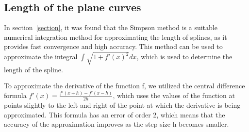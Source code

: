 \subsection{Length of the plane curves} 
In section~\ref{section}, it was found that the Simpson method is a suitable numerical integration method for approximating the length of splines, as it provides fast convergence and high accuracy. This method can be used to approximate the integral $\int \sqrt{1+f'(x)^{2}}dx$, which is used to determine the length of the spline.

To approximate the derivative of the function f, we utilized the central difference formula $f'(x) = \frac{f'(x+h) - f'(x-h)}{2h}$, which uses the values of the function at points slightly to the left and right of the point at which the derivative is being approximated. This formula has an error of order 2, which means that the accuracy of the approximation improves as the step size h becomes smaller.



